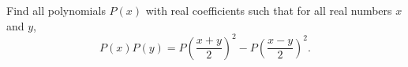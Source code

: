 Find all polynomials $P(x)$ with real coefficients such that for all real numbers $x$ and $y$,
\[P(x)P(y)=P\left(\dfrac{x+y}{2}\right)^2-P\left(\dfrac{x-y}{2}\right)^2.\]
